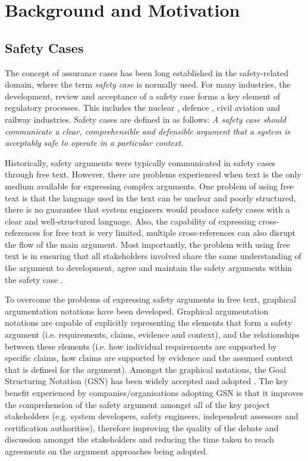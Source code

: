 \section{Background and Motivation}
\label{sec:background}

\subsection{Safety Cases}
The concept of assurance cases has been long established in the safety-related domain, where the term \textit{safety case} is normally used. 
For many industries, the development, review and acceptance of a safety case forms a key element of regulatory processes. This includes the nuclear \cite{hse}, defence \cite{mod2007}, civil aviation \cite{caa2007} and railway \cite{yellowBook2007} industries. 
Safety cases are defined in \cite{kelly2004goal} as follows: \textit{A safety case should communicate a clear, comprehensible and defensible argument that a system is acceptably safe to operate in a particular context}. 

Historically, safety arguments were typically communicated in safety cases through free text. However, there are problems experienced when text is the only medium available for expressing complex arguments. 
One problem of using free text is that the language used in the text can be unclear and poorly structured, there is no guarantee that system engineers would produce safety cases with a clear and well-structured language. 
Also, the capability of expressing cross-references for free text is very limited, multiple cross-references can also disrupt the flow of the main argument. 
Most importantly, the problem with using free text is in ensuring that all stakeholders involved share the same understanding of the argument to development, agree and maintain the safety arguments within the safety case \cite{kelly2004goal}.

To overcome the problems of expressing safety arguments in free text, graphical argumentation notations have been developed. 
Graphical argumentation notations are capable of explicitly representing the elements that form a safety argument (i.e. requirements, claims, evidence and context), and the relationships between these elements (i.e. how individual requirements are supported by specific claims, how claims are supported by evidence and the assumed context that is defined for the argument). 
Amongst the graphical notations, the Goal Structuring Notation (GSN) \cite{kelly2004goal} has been widely accepted and adopted \cite{chinneck2004turning}. 
The key benefit experienced by companies/organisations adopting GSN is that it improves the comprehension of the safety argument amongst all of the key project stakeholders (e.g. system developers, safety engineers, independent assessors and certification authorities), therefore improving the quality of the debate and discussion amongst the stakeholders and reducing the time taken to reach agreements on the argument approaches being adopted.

